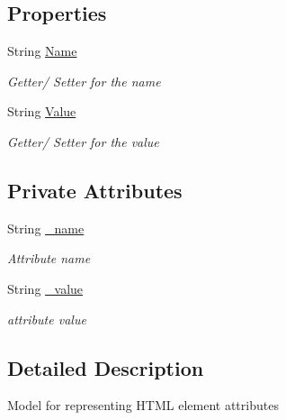 \subsection*{Properties}
\begin{DoxyCompactItemize}
\item 
String \hyperlink{class_web_analyzer_1_1_models_1_1_data_model_1_1_attribute_model_aed6ff726ffc8f9848b312f1dcb03594b}{Name}
\begin{DoxyCompactList}\small\item\em Getter/ Setter for the name \end{DoxyCompactList}\item 
String \hyperlink{class_web_analyzer_1_1_models_1_1_data_model_1_1_attribute_model_a132abb603aaf2d5bd36c3c3477b1c21d}{Value}
\begin{DoxyCompactList}\small\item\em Getter/ Setter for the value \end{DoxyCompactList}\end{DoxyCompactItemize}
\subsection*{Private Attributes}
\begin{DoxyCompactItemize}
\item 
String \hyperlink{class_web_analyzer_1_1_models_1_1_data_model_1_1_attribute_model_acaa56d04d7821e130c6f1d8a0036fd08}{\+\_\+name}
\begin{DoxyCompactList}\small\item\em Attribute name \end{DoxyCompactList}\item 
String \hyperlink{class_web_analyzer_1_1_models_1_1_data_model_1_1_attribute_model_a78fd60dadcd65ac87ef1fb49ec497055}{\+\_\+value}
\begin{DoxyCompactList}\small\item\em attribute value \end{DoxyCompactList}\end{DoxyCompactItemize}


\subsection{Detailed Description}
Model for representing H\+T\+M\+L element attributes 



